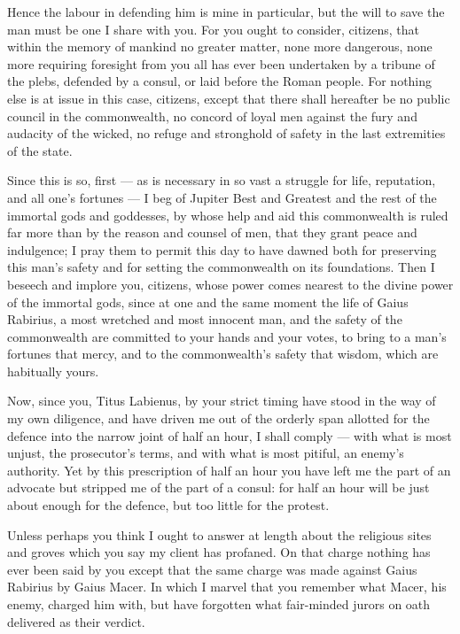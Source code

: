  Hence the labour in defending him is mine in particular, but the will to save the man must be one I share with you. For you ought to consider, citizens, that within the memory of mankind no greater matter, none more dangerous, none more requiring foresight from you all has ever been undertaken by a tribune of the plebs, defended by a consul, or laid before the Roman people. For nothing else is at issue in this case, citizens, except that there shall hereafter be no public council in the commonwealth, no concord of loyal men against the fury and audacity of the wicked, no refuge and stronghold of safety in the last extremities of the state.

 Since this is so, first --- as is necessary in so vast a struggle for life, reputation, and all one's fortunes --- I beg of Jupiter Best and Greatest and the rest of the immortal gods and goddesses, by whose help and aid this commonwealth is ruled far more than by the reason and counsel of men, that they grant peace and indulgence; I pray them to permit this day to have dawned both for preserving this man's safety and for setting the commonwealth on its foundations. Then I beseech and implore you, citizens, whose power comes nearest to the divine power of the immortal gods, since at one and the same moment the life of Gaius Rabirius, a most wretched and most innocent man, and the safety of the commonwealth are committed to your hands and your votes, to bring to a man's fortunes that mercy, and to the commonwealth's safety that wisdom, which are habitually yours.

 Now, since you, Titus Labienus, by your strict timing have stood in the way of my own diligence, and have driven me out of the orderly span allotted for the defence into the narrow joint of half an hour, I shall comply --- with what is most unjust, the prosecutor's terms, and with what is most pitiful, an enemy's authority. Yet by this prescription of half an hour you have left me the part of an advocate but stripped me of the part of a consul: for half an hour will be just about enough for the defence, but too little for the protest.

 Unless perhaps you think I ought to answer at length about the religious sites and groves which you say my client has profaned. On that charge nothing has ever been said by you except that the same charge was made against Gaius Rabirius by Gaius Macer. In which I marvel that you remember what Macer, his enemy, charged him with, but have forgotten what fair-minded jurors on oath delivered as their verdict.

